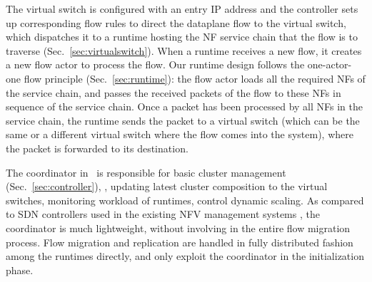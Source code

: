 The virtual switch is configured with an entry IP address and the controller sets up corresponding flow rules to direct the dataplane flow to the virtual switch,%
which dispatches it to a runtime hosting the NF service chain that the flow is to traverse (Sec.~\ref{sec:virtualswitch}). When a runtime receives a new flow, it creates a new flow actor to process the flow. Our runtime design follows the one-actor-one flow principle (Sec.~\ref{sec:runtime}): the flow actor loads all the required NFs of the service chain, and passes the received packets of the flow to these NFs in sequence of the service chain. Once a packet has been processed by all NFs in the service chain, the runtime sends the packet to a virtual switch (which can be the same or a different virtual switch where the flow comes into the system), where the packet is forwarded to its destination.




The coordinator in \nfactor~is responsible for basic cluster management (Sec.~\ref{sec:controller}), \eg, updating latest cluster composition to the virtual switches, monitoring workload of runtimes, control dynamic scaling. %
As compared to SDN controllers used in the existing NFV management systems \cite{gember2015opennf, rajagopalan2013split}%
, the coordinator is much lightweight, without involving in the entire flow migration process.%
Flow migration and replication are handled in fully distributed fashion among the runtimes directly, and only exploit the coordinator in the initialization phase.

